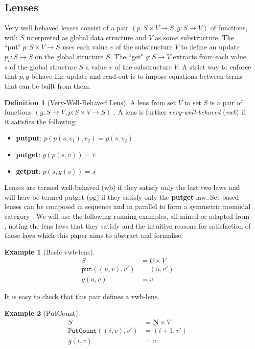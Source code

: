 \documentclass[a4paper,11pt]{article}
\theoremstyle{definition}
\newtheorem{defn}{Definition}
\theoremstyle{plain}
\theoremstyle{plain}
\theoremstyle{definition}
\newtheorem{example}{Example}
\begin{document}
\subsection{Lenses}
Very well behaved lenses \cite{foster_combinators_nodate} consist of a pair $(p:S\times V \rightarrow S,g:S \rightarrow V)$ of functions, with $S$ interpreted as global data structure and $V$ as some substructure. The ``put" $p:S\times V \rightarrow S$ uses each value $v$ of the substructure $V$ to define an update $p_{v}:S \rightarrow S$ on the global structure $S$. The ``get" $g:S \rightarrow V$ extracts from each value $s$ of the global structure $S$ a value $v$ of the substructure $V$. A strict way to enforce that $p,g$ behave like update and read-out is to impose equations between terms that can be built from them.
\begin{defn}[Very-Well-Behaved Lens]
A lens from set $V$ to set $S$ is a pair of functions $(g:S\rightarrow V,p:S \times V \rightarrow S)$ \cite{foster_combinators_nodate}. A lens is further \emph{very-well-behaved} (\emph{vwb}) if it satisfies the following:
\begin{itemize}
    \item \textbf{putput}: $p(p(s,v_1),v_2) = p(s,v_2)$
    \item \textbf{putget}: $g(p(s,v)) = v$
    \item \textbf{getput}: $p(s,g(s)) = s$
\end{itemize}
\end{defn}
Lenses are termed well-behaved (wb) if they satisfy only the last two laws and will here be termed putget (pg) if they satisfy only the \textbf{putget} law. Set-based lenses can be composed in sequence and in parallel to form a symmetric monoidal category \cite{Riley2018CategoriesOO}. We will use the following running examples, all mined or adapted from \cite{fischer_lens, nakano}, noting the lens laws that they satisfy and the intuitive reasons for satisfaction of those laws which this paper aims to abstract and formalise.
\begin{example}[Basic vwb-lens]
\begin{align*}
    S &= U \times V \\
    \texttt{put}((u,v),v') &= (u,v') \\
    g(u,v) &= v
\end{align*}
\end{example}
It is easy to check that this pair defines a vwb-lens.
\begin{example}[PutCount]
\begin{align*}
    S &= \mathbf{N} \times V \\
    \texttt{PutCount}((i,v),v') &= (i+1,v') \\
    g(i,v) &= v
\end{align*}
\end{example}
\end{document}
